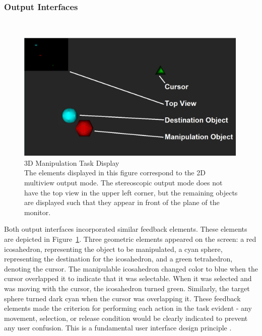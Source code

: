 \documentclass[pageno]{jpaper}
\begin{document}
\subsubsection{Output Interfaces}$ $\\
\begin{figure}
\centering
\includegraphics[width=0.99\textwidth]{figures/labelledexperiment.png}
\caption{3D Manipulation Task Display \\
The elements displayed in this figure correspond to the 2D multiview output mode. The stereoscopic
output mode does not have the top view in the upper left corner, but the remaining objects are displayed
such that they appear in front of the plane of the monitor.}
\label{fig:experimentdisplay}
\end{figure}
Both output interfaces incorporated similar feedback elements. These elements are depicted in
Figure~\ref{fig:experimentdisplay}. Three geometric elements
appeared on the screen: a red icosahedron, representing the object to be manipulated, a
cyan sphere, representing the destination for the icosahedron, and a green tetrahedron,
denoting the cursor. The manipulable icosahedron changed color to blue when the cursor
overlapped it to indicate that it was selectable. When it was selected and was moving
with the cursor, the icosahedron turned green. Similarly, the target sphere turned dark
cyan when the cursor was overlapping it. These feedback elements made the criterion for
performing each action in the task evident -
any movement, selection, or release condition would be clearly indicated to prevent any user
confusion. This is a fundamental user interface design principle \cite{bravenuiworld}.
\end{document}
